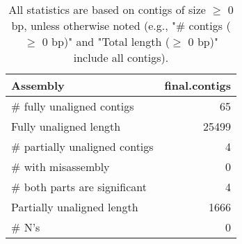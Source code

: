 \documentclass[12pt,a4paper]{article}
\begin{document}
\begin{table}[ht]
\begin{center}
\caption{All statistics are based on contigs of size $\geq$ 0 bp, unless otherwise noted (e.g., "\# contigs ($\geq$ 0 bp)" and "Total length ($\geq$ 0 bp)" include all contigs).}
\begin{tabular}{|l*{1}{|r}|}
\hline
Assembly & final.contigs \\ \hline
\# fully unaligned contigs & 65 \\ \hline
Fully unaligned length & 25499 \\ \hline
\# partially unaligned contigs & 4 \\ \hline
\hspace{5mm}\# with misassembly & 0 \\ \hline
\hspace{5mm}\# both parts are significant & 4 \\ \hline
Partially unaligned length & 1666 \\ \hline
\# N's & 0 \\ \hline
\end{tabular}
\end{center}
\end{table}
\end{document}
